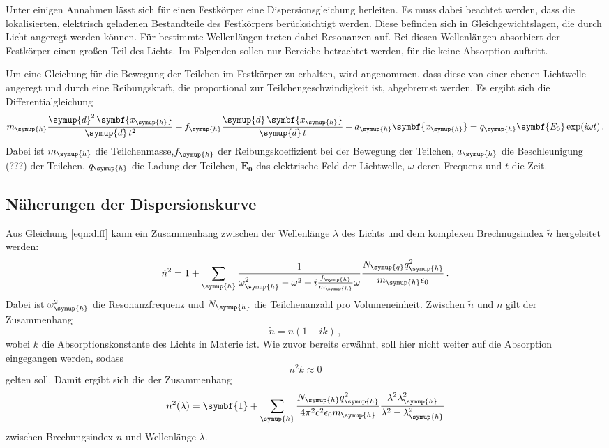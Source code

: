 Unter einigen Annahmen lässt sich für einen Festkörper eine Dispersionsgleichung
herleiten. Es muss dabei beachtet werden, dass die lokalisierten, elektrisch geladenen
Bestandteile des Festkörpers berücksichtigt werden. Diese befinden sich in Gleichgewichtslagen,
die durch Licht angeregt werden können. Für bestimmte Wellenlängen treten dabei
Resonanzen auf. Bei diesen Wellenlängen absorbiert der Festkörper einen großen Teil
des Lichts. Im Folgenden sollen nur Bereiche betrachtet werden, für die keine
Absorption auftritt.

Um eine Gleichung für die Bewegung der Teilchen im Festkörper zu erhalten, wird
angenommen, dass diese von einer ebenen Lichtwelle angeregt und durch eine Reibungskraft,
die proportional zur Teilchengeschwindigkeit ist, abgebremst werden. Es ergibt sich
die Differentialgleichung
\begin{equation}
  m_{\symup{h}}\frac{\symup{d}^2\,\symbf{x_{\symup{h}}}}{\symup{d}\,t^2}
  +f_{\symup{h}}\frac{\symup{d}\,\symbf{x_{\symup{h}}}}{\symup{d}\,t}
  +a_{\symup{h}}\symbf{x_{\symup{h}}}=q_{\symup{h}}\symbf{E_0}\exp(i \omega t)\,.
  \label{eqn:diff}
\end{equation}
Dabei ist $m_{\symup{h}}$ die Teilchenmasse,$f_{\symup{h}}$ der Reibungskoeffizient
bei der Bewegung der Teilchen, $a_{\symup{h}}$ die Beschleunigung (???) der Teilchen,
$q_{\symup{h}}$ die Ladung der Teilchen, $\symbf{E_0}$ das elektrische Feld der Lichtwelle,
$\omega$ deren Frequenz und $t$ die Zeit.

\subsection{Näherungen der Dispersionskurve}
\label{subsec:dispersion2}

Aus Gleichung \eqref{eqn:diff} kann ein Zusammenhang zwischen der Wellenlänge $\lambda$ des
Lichts und dem komplexen Brechnugsindex $\tilde{n}$ hergeleitet werden:
\begin{equation}
  \tilde{n}^2=1+\sum_{\symup{h}}\frac{1}{\omega_{\symup{h}}^2-\omega^2
  +i\frac{f_{\symup{h}}}{m_{\symup{h}}}\omega} \frac{N_{\symup{q}} q_{\symup{h}}^2}
  {m_{\symup{h}} \epsilon_0} \,.
\end{equation}
Dabei ist $\omega_{\symup{h}}^2$ die Resonanzfrequenz und $N_{\symup{h}}$ die
Teilchenanzahl pro Volumeneinheit. Zwischen $\tilde{n}$ und $n$ gilt der Zusammenhang
\begin{equation}
  \tilde{n}=n(1-ik)\,,
\end{equation}
wobei $k$ die Absorptionskonstante des Lichts in Materie ist. Wie zuvor bereits erwähnt,
soll hier nicht weiter auf die Absorption eingegangen werden, sodass
\begin{equation}
  n^2k\approx0
\end{equation}
gelten soll. Damit ergibt sich die der Zusammenhang
\begin{equation}
  {n}^2 (\lambda) = \symbf{1}+\sum_{\symup{h}} \frac{N_{\symup{h}}q_{\symup{h}}^2}
  {4 \pi^2 c^2 \epsilon_0 m_{\symup{h}}}
  \frac{\lambda^2 \lambda_{\symup{h}}^2}{\lambda^2-\lambda_{\symup{h}}^2}
  \label{eqn:dispersion}
\end{equation}
zwischen Brechungsindex $n$ und Wellenlänge $\lambda$.


